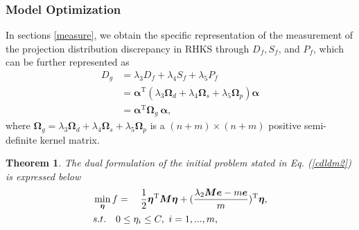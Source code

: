 \documentclass[a4paper]{cas-sc}
\newtheorem{myTheo}{Theorem}
\begin{document}
\subsubsection{Model Optimization}\label{optimization}
In sections \ref{measure}, we obtain the specific representation of the measurement of the projection distribution discrepancy in RHKS through $D_f, S_f$, and $P_f$, which can be further represented as
\begin{equation}\label{D_g}
\begin{aligned}
D_g &= \lambda_3 D_f + \lambda_4 S_f + \lambda_5 P_f \\
&= \boldsymbol{\alpha}^{\mathrm{T}}(\lambda_3 \boldsymbol{\Omega}_d + \lambda_4 \boldsymbol{\Omega}_s +\lambda_5 \boldsymbol{\Omega}_p)\boldsymbol{\alpha} \\
&= \boldsymbol{\alpha}^{\mathrm{T}} \boldsymbol{\Omega}_{g}\ \boldsymbol{\alpha},
\end{aligned}
\end{equation}
where $\boldsymbol{\Omega}_g = \lambda_3 \boldsymbol{\Omega}_d + \lambda_4 \boldsymbol{\Omega}_s +\lambda_5 \boldsymbol{\Omega}_p$ is a $(n+m) \times (n+m)$ positive  semi-definite kernel matrix.


\begin{myTheo}\label{QPP}
The dual formulation of the initial problem stated in Eq. (\ref{cdldm2}) is expressed below
\begin{equation}
\begin{aligned}
\label{end}
&\mathop {\min } \limits_{\boldsymbol{\eta}} f= \quad {\rm{   }}\frac{1}{2}{\boldsymbol{\eta}^{\mathrm{T}}}\boldsymbol{M}\boldsymbol{\eta} + {(\frac{{{\lambda _2}\boldsymbol{M}\boldsymbol{e} - m\boldsymbol{e}}}{m})^{\mathrm{T}}}\boldsymbol{\eta}, \\
& s.t.\quad  0 \le \eta_i  \le {C} ,\ i = 1,...,m,
\end{aligned}
\end{equation}
\end{myTheo}
\end{document}
